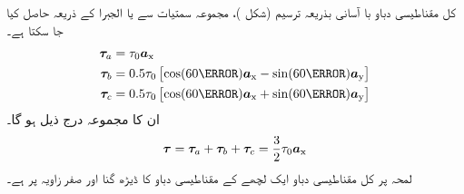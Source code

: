 کل مقناطیسی دباو با آسانی بذریعہ ترسیم (شکل )،  مجموعہ سمتیات سے   یا  الجبرا کے ذریعہ حاصل کیا جا سکتا ہے۔
\begin{gather}
\begin{aligned}
\kvec{\tau}_a&=\tau_0 \ax\\
\kvec{\tau}_b&=0.5 \tau_0 \left[\cos (60\degree) \ax-\sin (60\degree)\ay \right]\\
\kvec{\tau}_c&=0.5 \tau_0 \left[\cos (60\degree) \ax+\sin (60\degree)\ay \right]
\end{aligned}
\end{gather}
ان کا مجموعہ درج ذیل ہو گا۔
\begin{align}
{\ensuremath{{\boldsymbol{\tau}}}}={{\boldsymbol{\tau}}}_a+{{\boldsymbol{\tau}}}_b+{{\boldsymbol{\tau}}}_c=\frac{3}{2} \tau_0 {\boldsymbol{a}}_{\textup{x}}
\end{align}
لمحہ  پر کل مقناطیسی دباو ایک لچھے کے مقناطیسی دباو کا ڈیڑھ گنا  اور  صفر زاویہ پر ہے۔

